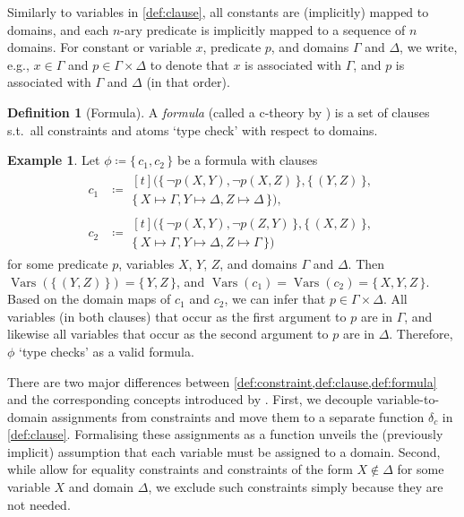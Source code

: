 \documentclass[letterpaper]{article} %
\DeclareMathOperator{\Vars}{Vars}
\theoremstyle{definition}
\newtheorem{definition}{Definition}
\newtheorem{example}{Example}
\begin{document}
Similarly to variables in \cref{def:clause}, all constants are (implicitly)
mapped to domains, and each $n$-ary predicate is implicitly mapped to a sequence
of $n$ domains. For constant or variable $x$, predicate $p$, and domains
$\Gamma$ and $\Delta$, we write, e.g., $x \in \Gamma$ and
$p \in \Gamma \times \Delta$ to denote that $x$ is associated with $\Gamma$, and
$p$ is associated with $\Gamma$ and $\Delta$ (in that order).

\begin{definition}[Formula]\label{def:formula}
  A \emph{formula} (called a c-theory by \citet{DBLP:conf/ijcai/BroeckTMDR11})
  is a set of clauses s.t.\ all constraints and atoms `type check' with respect
  to domains.
\end{definition}

\begin{example}\label{example:first}
  Let $\phi \coloneqq \{\, c_1, c_2 \,\}$ be a formula with clauses
  \begin{align*}
    c_1 &\coloneqq
          \begin{multlined}[t]
            (\{\, \neg p(X, Y), \neg p(X, Z) \,\}, \{\, (Y, Z) \,\}, \\
            \{\, X \mapsto \Gamma, Y \mapsto \Delta, Z \mapsto \Delta \,\}),
          \end{multlined}\\
    c_2 &\coloneqq
          \begin{multlined}[t]
            (\{\, \neg p(X, Y), \neg p(Z, Y) \,\}, \{\, (X, Z) \,\}, \\
            \{\, X \mapsto \Gamma, Y \mapsto \Delta, Z \mapsto \Gamma \,\})
          \end{multlined}
  \end{align*}
  for some predicate $p$, variables $X$, $Y$, $Z$, and domains $\Gamma$ and
  $\Delta$. Then $\Vars(\{\, (Y, Z) \,\}) = \{\, Y, Z \,\}$, and
  $\Vars(c_{1}) = \Vars(c_{2}) = \{\, X, Y, Z \,\}$. Based on the domain maps of
  $c_{1}$ and $c_{2}$, we can infer that $p \in \Gamma \times \Delta$. All
  variables (in both clauses) that occur as the first argument to $p$ are in
  $\Gamma$, and likewise all variables that occur as the second argument to $p$
  are in $\Delta$. Therefore, $\phi$ `type checks' as a valid formula.
\end{example}

There are two major differences between
\cref{def:constraint,def:clause,def:formula} and the corresponding concepts
introduced by \citet{DBLP:conf/ijcai/BroeckTMDR11}. First, we decouple
variable-to-domain assignments from constraints and move them to a separate
function $\delta_{c}$ in \cref{def:clause}. Formalising these assignments as a
function unveils the (previously implicit) assumption that each variable must be
assigned to a domain. Second, while \citet{DBLP:conf/ijcai/BroeckTMDR11} allow
for equality constraints and constraints of the form $X \not\in \Delta$ for some
variable $X$ and domain $\Delta$, we exclude such constraints simply because
they are not needed.
\end{document}
